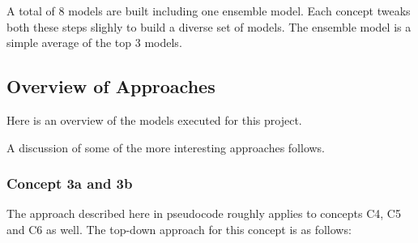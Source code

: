 \documentclass[floatsintext,man]{apa6}
\theoremstyle{definition}
\theoremstyle{definition}
\theoremstyle{definition}
\theoremstyle{remark}
\begin{document}
A total of 8 models are built including one ensemble model. Each concept
tweaks both these steps slighly to build a diverse set of models. The
ensemble model is a simple average of the top 3 models.

\subsection{Overview of Approaches}\label{overview-of-approaches}

Here is an overview of the models executed for this project.

\begin{table}[H]

\caption{\label{tab:unnamed-chunk-5}Model Details}
\centering
{}
\end{table}

A discussion of some of the more interesting approaches follows.

\subsubsection{Concept 3a and 3b}\label{concept-3a-and-3b}

The approach described here in pseudocode roughly applies to concepts
C4, C5 and C6 as well. The top-down approach for this concept is as
follows:
\end{document}
